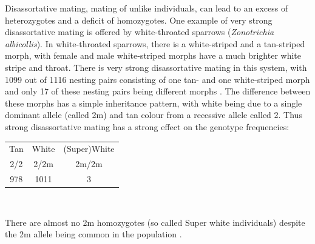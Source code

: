 Disassortative mating, mating of unlike individuals, can lead to
an excess of heterozygotes and a deficit of homozygotes.
One example of very strong disassortative mating is offered by
white-throated sparrows ({\it Zonotrichia albicollis}). 
In white-throated sparrows, there is a white-striped and a tan-striped
morph, with female and male white-striped morphs have a much brighter white stripe
and throat. There is very strong disassortative mating in this system, with 1099
out of 1116 nesting pairs consisting of one tan- and one white-striped
morph and only 17 of these
nesting pairs being different morphs \citep{tuttle2016divergence}. The
difference between these morphs has a simple inheritance pattern, with
white being due to a single dominant allele (called 2m) and tan colour from a recessive allele called
2. Thus strong disassortative mating has a strong effect on the
genotype frequencies:  \\
\begin{center}
\begin{tabular}{ccc}
  Tan & White & (Super)White \\
2/2  & 2/2m   & 2m/2m \\
978    & 1011 & 3 \\
\end{tabular}\\
\end{center}
There are almost no 2m homozygotes (so called Super
white individuals)
despite the 2m allele being common in the population \citep[data from
][ table S1]{tuttle2016divergence}.

